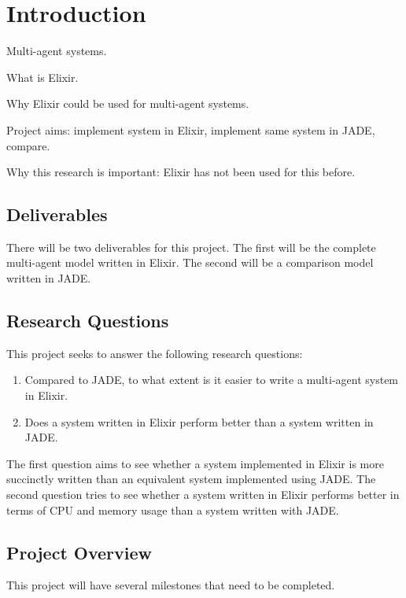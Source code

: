\section{Introduction}

Multi-agent systems.

What is Elixir.

Why Elixir could be used for multi-agent systems.

Project aims: implement system in Elixir, implement same system in JADE, compare.

Why this research is important: Elixir has not been used for this before.

\subsection{Deliverables}

There will be two deliverables for this project.
The first will be the complete multi-agent model written in Elixir.
The second will be a comparison model written in JADE\@.

\subsection{Research Questions}

This project seeks to answer the following research questions:

\begin{enumerate}
    \item Compared to JADE, to what extent is it easier to write a multi-agent system in Elixir.
    \item Does a system written in Elixir perform better than a system written in JADE\@.
\end{enumerate}

The first question aims to see whether a system implemented in Elixir is more succinctly written than an equivalent system implemented using JADE\@.
The second question tries to see whether a system written in Elixir performs better in terms of CPU and memory usage than a system written with JADE\@.

\subsection{Project Overview}

This project will have several milestones that need to be completed.

